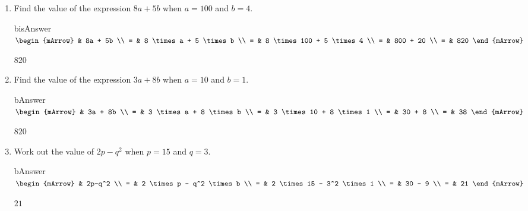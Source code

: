 \begin{enumerate}
  \item Find the value of the expression $ 8a + 5b$ when $a=100$ and $b=4$.
      \begin{envOut}[height=6cm]{bisAnswer}
		 $\begin{mArrow}
		        & 8a + 5b                      \\ 
              = & 8 \times a + 5 \times b      \\ 
              = & 8 \times 100 + 5 \times 4    \\ 
              = & 800 + 20                     \\
              = & 820						  
	      \end{mArrow}$
      \end{envOut}			  
	  \begin{exercise}\begin{shortsolution}  
	       $820$
      \end{shortsolution}\end{exercise}

  \item \begin{exercise} Find the value of the expression $ 3a + 8b$ when $a=10$ and $b=1$.
        \begin{envOut}[height=6cm]{bAnswer}
		     $\begin{mArrow}
		        & 3a + 8b                      \\ 
              = & 3 \times a + 8 \times b      \\ 
              = & 3 \times 10 + 8 \times 1     \\ 
              = & 30 + 8                       \\
              = & 38						  
	         \end{mArrow}$
        \end{envOut}			  
	    \begin{shortsolution}$820$\end{shortsolution}
	  \end{exercise}


  \item \begin{exercise} Work out the value of $2p−q^2$ when $p=15$ and $q=3$.
        \begin{envOut}[height=6cm]{bAnswer}
		     $\begin{mArrow}
		        & 2p-q^2                      \\ 
              = & 2 \times p - q^2 \times b      \\ 
              = & 2 \times 15 - 3^2 \times 1     \\ 
              = & 30 - 9                       \\
              = & 21						  
	         \end{mArrow}$
        \end{envOut}			  
	    \begin{shortsolution}$21$\end{shortsolution}
	  \end{exercise}


\end{enumerate}
